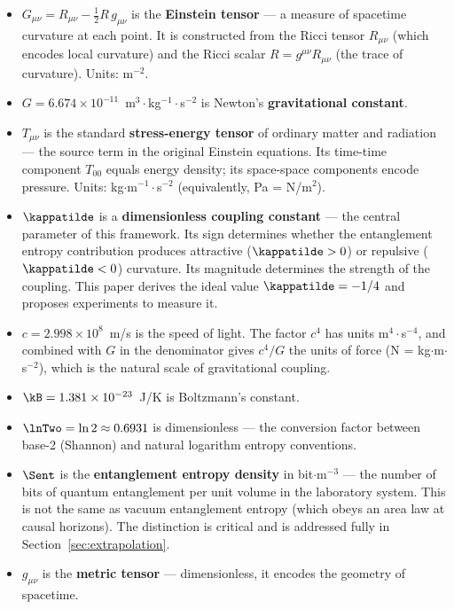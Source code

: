 \begin{itemize}
    \item $G_{\mu\nu} = R_{\mu\nu} - \frac{1}{2}R\,g_{\mu\nu}$ is the
    \textbf{Einstein tensor} --- a measure of spacetime curvature at each
    point. It is constructed from the Ricci tensor $R_{\mu\nu}$ (which
    encodes local curvature) and the Ricci scalar $R = g^{\mu\nu}R_{\mu\nu}$
    (the trace of curvature). Units: m$^{-2}$.

    \item $G = 6.674\times10^{-11}$~m$^3\cdot$kg$^{-1}\cdot$s$^{-2}$ is
    Newton's \textbf{gravitational constant}.

    \item $T_{\mu\nu}$ is the standard \textbf{stress-energy tensor} of
    ordinary matter and radiation --- the source term in the original Einstein
    equations. Its time-time component $T_{00}$ equals energy density; its
    space-space components encode pressure. Units:
    kg$\cdot$m$^{-1}\cdot$s$^{-2}$ (equivalently, Pa = N/m$^2$).

    \item $\kappatilde$ is a \textbf{dimensionless coupling constant} --- the
    central parameter of this framework. Its sign determines whether the
    entanglement entropy contribution produces attractive ($\kappatilde > 0$)
    or repulsive ($\kappatilde < 0$) curvature. Its magnitude determines the
    strength of the coupling. This paper derives the ideal value
    $\kappatilde = -1/4$ and proposes experiments to measure it.

    \item $c = 2.998\times10^8$~m/s is the speed of light. The factor $c^4$
    has units m$^4\cdot$s$^{-4}$, and combined with $G$ in the denominator
    gives $c^4/G$ the units of force (N = kg$\cdot$m$\cdot$s$^{-2}$), which
    is the natural scale of gravitational coupling.

    \item $\kB = 1.381\times10^{-23}$~J/K is Boltzmann's constant.

    \item $\lnTwo = \ln 2 \approx 0.6931$ is dimensionless --- the conversion
    factor between base-2 (Shannon) and natural logarithm entropy conventions.

    \item $\Sent$ is the \textbf{entanglement entropy density} in
    bit$\cdot$m$^{-3}$ --- the number of bits of quantum entanglement per
    unit volume in the laboratory system. This is not the same as vacuum
    entanglement entropy (which obeys an area law at causal horizons). The
    distinction is critical and is addressed fully in
    Section~\ref{sec:extrapolation}.

    \item $g_{\mu\nu}$ is the \textbf{metric tensor} --- dimensionless, it
    encodes the geometry of spacetime.
\end{itemize}

